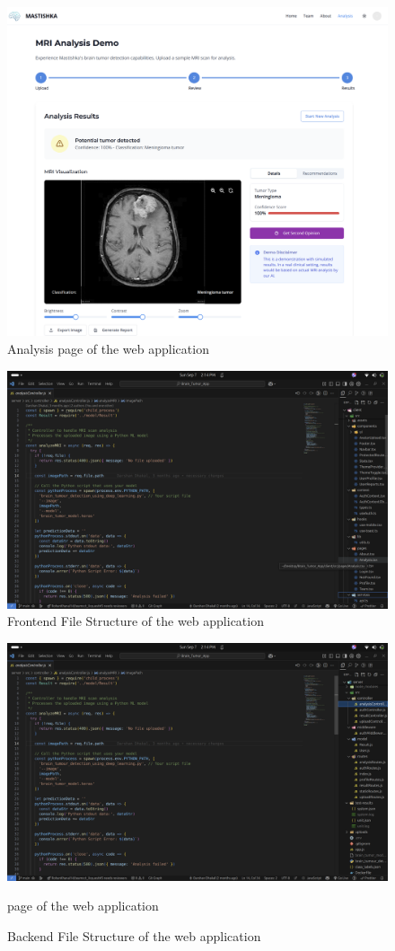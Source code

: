 \begin{figure}[H]
    \centering
    \includegraphics[width=1\linewidth]{App/analysis2.png}
    \caption{Analysis page of the web application}
    \label{fig:analysis2_page}
\end{figure}

\begin{figure}[H]
    \centering
    \includegraphics[width=1\linewidth]{App/Frontend.png}
    \caption{Frontend File Structure of the web application}
    \label{fig:frontend_page}
\end{figure}

\begin{figure}[H]
    \centering
    \includegraphics[width=1\linewidth]{App/Backend.png}
    \caption{Backend File Structure of the web application}page of the web application
    \label{fig:backend_page}
\end{figure}

